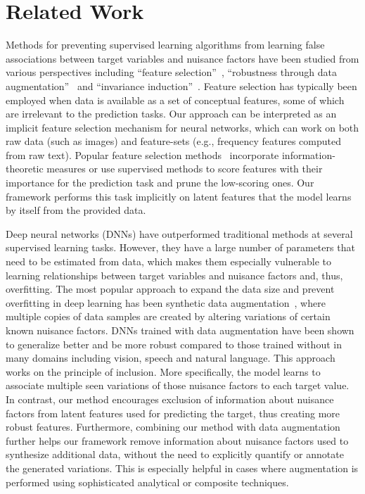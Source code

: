 \section{Related Work}
\label{sec:related_work}

Methods for preventing supervised learning algorithms from learning false associations between target variables and nuisance factors have been studied from various perspectives including ``feature selection''~\cite{bib:feat_select}, ``robustness through data augmentation''~\cite{bib:data_aug_1,bib:data_aug_2} and ``invariance induction''~\cite{bib:drl,bib:vfae,bib:sai}. Feature selection has typically been employed when data is available as a set of conceptual features, some of which are irrelevant to the prediction tasks. Our approach can be interpreted as an implicit feature selection mechanism for neural networks, which can work on both raw data (such as images) and feature-sets (e.g., frequency features computed from raw text). Popular feature selection methods~\cite{bib:feat_select} incorporate information-theoretic measures or use supervised methods to score features with their importance for the prediction task and prune the low-scoring ones. Our framework performs this task implicitly on latent features that the model learns by itself from the provided data.

Deep neural networks (DNNs) have outperformed traditional methods at several supervised learning tasks. However, they have a large number of parameters that need to be estimated from data, which makes them especially vulnerable to learning relationships between target variables and nuisance factors and, thus, overfitting. The most popular approach to expand the data size and prevent overfitting in deep learning has been synthetic data augmentation~\cite{bib:drl,bib:face_rec,bib:sbmrinet,bib:data_aug_1,bib:data_aug_2}, where multiple copies of data samples are created by altering variations of certain known nuisance factors. DNNs trained with data augmentation have been shown to generalize better and be more robust compared to those trained without in many domains including vision, speech and natural language. This approach works on the principle of inclusion. More specifically, the model learns to associate multiple seen variations of those nuisance factors to each target value. In contrast, our method encourages exclusion of information about nuisance factors from latent features used for predicting the target, thus creating more robust features. Furthermore, combining our method with data augmentation further helps our framework remove information about nuisance factors used to synthesize additional data, without the need to explicitly quantify or annotate the generated variations. This is especially helpful in cases where augmentation is performed using sophisticated analytical or composite techniques.

